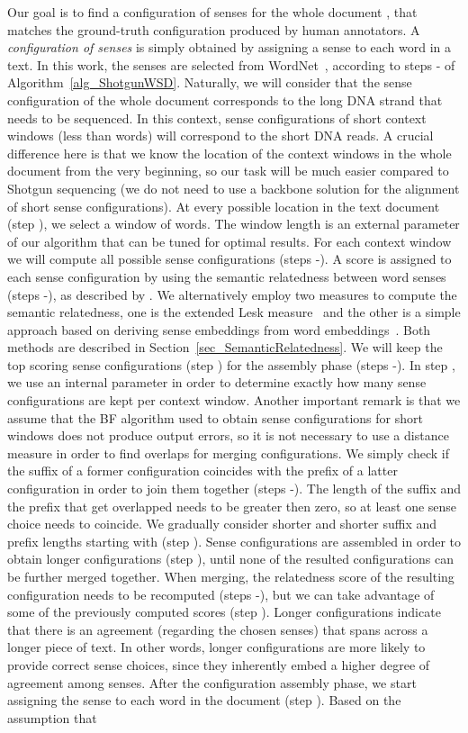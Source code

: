 \documentclass[11pt]{article}
\begin{document}
Our goal is to find a configuration of senses  for the whole document , that matches the ground-truth configuration produced by human annotators. A \emph{configuration of senses} is simply obtained by assigning a sense to each word in a text. In this work, the senses are selected from WordNet~\cite{Miller-WN-1995,Fellbaum-WN-1998}, according to steps - of Algorithm~\ref{alg_ShotgunWSD}. Naturally, we will consider that the sense configuration of the whole document corresponds to the long DNA strand that needs to be sequenced. In this context, sense configurations of short context windows (less than  words) will correspond to the short DNA reads. A crucial difference here is that we know the location of the context windows in the whole document from the very beginning, so our task will be much easier compared to Shotgun sequencing (we do not need to use a backbone solution for the alignment of short sense configurations). At every possible location in the text document (step ), we select a window of  words. The window length  is an external parameter of our algorithm that can be tuned for optimal results. For each context window we will compute all possible sense configurations (steps -). A score is assigned to each sense configuration by using the semantic relatedness between word senses (steps -), as described by . We alternatively employ two measures to compute the semantic relatedness, one is the extended Lesk measure~\cite{Banerjee-CICLING-2002,Banerjee-IJCAI-2003} and the other is a simple approach based on deriving sense embeddings from word embeddings~\cite{Mikolov-NIPS-2013}. Both methods are described in Section~\ref{sec_SemanticRelatedness}. We will keep the top scoring sense configurations (step ) for the assembly phase (steps -). In step , we use an internal parameter  in order to determine exactly how many sense configurations are kept per context window. Another important remark is that we assume that the BF algorithm used to obtain sense configurations for short windows does not produce output errors, so it is not necessary to use a distance measure in order to find overlaps for merging configurations. We simply check if the suffix of a former configuration coincides with the prefix of a latter configuration in order to join them together (steps -). The length  of the suffix and the prefix that get overlapped needs to be greater then zero, so at least one sense choice needs to coincide. We gradually consider shorter and shorter suffix and prefix lengths starting with  (step ). Sense configurations are assembled in order to obtain longer configurations (step ), until none of the resulted configurations can be further merged together. When merging, the relatedness score of the resulting configuration needs to be recomputed (steps -), but we can take advantage of some of the previously computed scores (step ). Longer configurations indicate that there is an agreement (regarding the chosen senses) that spans across a longer piece of text. In other words, longer configurations are more likely to provide correct sense choices, since they inherently embed a higher degree of agreement among senses. After the configuration assembly phase, we start assigning the sense to each word in the document (step ). Based on the assumption that 
\end{document}
